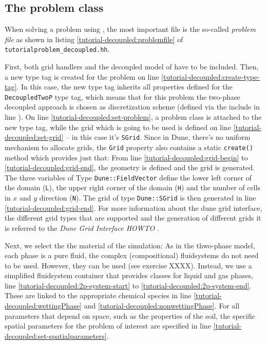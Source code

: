 \subsection{The problem class} \label{decoupled_problem}

When solving a problem using \Dumux, the most important file is the
so-called \textit{problem file} as shown in listing
\ref{tutorial-decoupled:problemfile} of
\texttt{tutorialproblem\_decoupled.hh}.

\begin{lst}\label{tutorial-decoupled:problemfile} \mbox{}

\end{lst}

First, both \Dune  grid handlers and the decoupled model of \Dumux 
have to be included. Then, a new type tag is created for the problem 
on line \ref{tutorial-decoupled:create-type-tag}.  In this case, the 
new type tag inherits all properties defined for the \texttt{DecoupledTwoP} 
type tag, which means that for this problem the two-phase decoupled approach
is chosen as discretization scheme (defined via the include in line 
\label{tutorial-decoupled:parent-problem}). On line \ref{tutorial-decoupled:set-problem}, 
a problem class is attached to the new type tag, while the grid which
is going to be used is defined on line \ref{tutorial-decoupled:set-grid} --
in this case it's \texttt{SGrid}.  Since in Dune, there's no uniform
mechanism to allocate grids, the \texttt{Grid} property also contains
a static \texttt{create()} method which provides just that: From line 
\ref{tutorial-decoupled:grid-begin} to \ref{tutorial-decoupled:grid-end}, 
the geometry is defined and the grid is generated. The three variables of 
Type \texttt{Dune::FieldVector} define the lower left corner of the domain 
(\texttt{L}), the upper right corner of the domain (\texttt{H}) and the number 
of cells in $x$ and $y$ direction (\texttt{N}). The grid of type 
\texttt{Dune::SGrid} is then generated in line \ref{tutorial-decoupled:grid-end}. 
For more information about the dune grid interface, the different grid types 
that are supported and the generation of different grids it is referred to 
the \textit{Dune Grid Interface HOWTO} \cite{DUNE-HP}. 

Next, we select the the material of the simulation: As in the thwo-phase
model, each phase is a pure fluid, the complex (compositional) fluidsystems
do not need to be used. However, they can be used (see exercise XXXX). 
Instead, we use a simplified fluidsystem container that provides classes 
for liquid and gas phases, line \ref{tutorial-decoupled:2p-system-start} to 
\ref{tutorial-decoupled:2p-system-end}. These are linked to the appropriate 
chemical species in line \ref{tutorial-decoupled:wettingPhase} and 
\ref{tutorial-decoupled:nonwettingPhase}. For all parameters that depend 
on space, such as the properties of the soil, the specific spatial parameters 
for the problem of interest are specified in line
\ref{tutorial-decoupled:set-spatialparameters}. 

